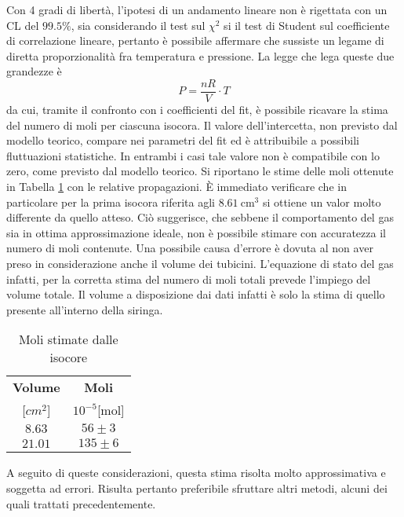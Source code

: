 \documentclass[a4paper,11pt,oneside]{article}
\begin{document}
Con 4 gradi di libertà, l'ipotesi di un andamento lineare non è rigettata con un CL del $99.5\%$, sia considerando il test sul $\chi^{2}$ si il test di Student sul coefficiente di correlazione lineare, pertanto è possibile  affermare che sussiste un legame di diretta proporzionalità fra temperatura e pressione.
La legge che lega queste due grandezze è
\begin{equation*}
    P=\frac{nR}{V}\cdot T
\end{equation*}
da cui, tramite il confronto con i coefficienti del fit, è possibile ricavare la stima del numero di moli per ciascuna isocora. Il valore dell'intercetta, non previsto dal modello teorico, compare nei parametri del fit ed è attribuibile a possibili fluttuazioni statistiche. In entrambi i casi tale valore non è compatibile con lo zero, come previsto dal modello teorico.
Si riportano le stime delle moli ottenute in Tabella \ref{tab:moli_isocore} con le relative propagazioni. È immediato verificare che in particolare per la prima isocora riferita agli $\SI{8.61}{\centi\meter\cubed}$ si ottiene un valor molto differente da quello atteso. Ciò suggerisce, che sebbene il comportamento del gas sia in ottima approssimazione ideale, non è possibile stimare con accuratezza il numero di moli contenute. Una possibile causa d'errore è dovuta al non aver preso in considerazione anche il volume dei tubicini. L'equazione di stato del gas infatti, per la corretta stima del numero di moli totali prevede l'impiego del volume totale. Il volume a disposizione dai dati infatti è solo la stima di quello presente all'interno della siringa.

\begin{table}[h!]
    \centering
    \begin{tabular}{|c|c|}
        \hline
        \textbf{Volume} & \textbf{Moli} \\
        \si{[$cm^2$]} & $10^{-5}$[mol] \\ \hline
        \rowcolor[rgb]{0.85,0.85,0.85}$8.63$ & $56\pm3$\\ \hline
        $21.01$ & $135\pm6$\\ \hline
    \end{tabular}
    \caption{Moli stimate dalle isocore}
    \label{tab:moli_isocore}
\end{table}


A seguito di queste considerazioni, questa stima risolta molto approssimativa e soggetta ad errori. Risulta pertanto preferibile sfruttare altri metodi, alcuni dei quali trattati precedentemente.
\end{document}
